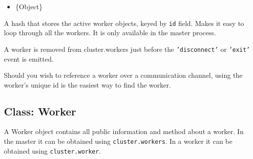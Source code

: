 \begin{itemize}
\itemsep1pt\parskip0pt
\item
  \{Object\}
\end{itemize}

A hash that stores the active worker objects, keyed by \texttt{id}
field. Makes it easy to loop through all the workers. It is only
available in the master process.

A worker is removed from cluster.workers just before the
\texttt{'disconnect'} or \texttt{'exit'} event is emitted.

\begin{Shaded}
\begin{Highlighting}[]
 
   \NormalTok{(}  \NormalTok{) \{}
    \NormalTok{(}\NormalTok{[id]);}
  \NormalTok{\}}
\NormalTok{\}}
\NormalTok{(}
  \NormalTok{(}\NormalTok{);}
\NormalTok{\});}
\end{Highlighting}
\end{Shaded}

Should you wish to reference a worker over a communication channel,
using the worker's unique id is the easiest way to find the worker.

\begin{Shaded}
\begin{Highlighting}[]
\NormalTok{(}\NormalTok{, }
   \NormalTok{[id];}
\NormalTok{\});}
\end{Highlighting}
\end{Shaded}

\subsection{Class: Worker}\label{class-worker}

A Worker object contains all public information and method about a
worker. In the master it can be obtained using \texttt{cluster.workers}.
In a worker it can be obtained using \texttt{cluster.worker}.

